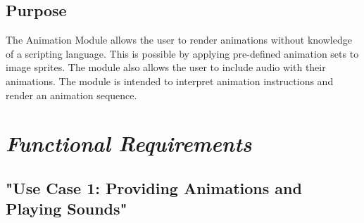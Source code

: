 \documentclass[12pt]{article}
\begin{document}
	\subsection{Purpose}
        The Animation Module allows the user to render animations without knowledge of a scripting language. This is possible by applying pre-defined animation sets to image sprites. The module also allows the user to include audio with their animations. The module is intended to interpret animation instructions and render an animation sequence.


\section{\emph{Functional Requirements}}
	\subsection{"Use Case 1: Providing Animations and Playing Sounds"}
\end{document}
